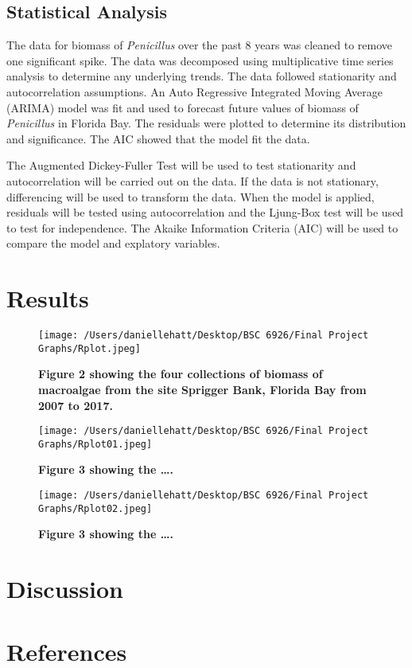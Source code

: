 \documentclass[]{article}
\begin{document}
\hypertarget{statistical-analysis}{%
\subsection{Statistical Analysis}\label{statistical-analysis}}

The data for biomass of \emph{Penicillus} over the past 8 years was
cleaned to remove one significant spike. The data was decomposed using
multiplicative time series analysis to determine any underlying trends.
The data followed stationarity and autocorrelation assumptions. An Auto
Regressive Integrated Moving Average (ARIMA) model was fit and used to
forecast future values of biomass of \emph{Penicillus} in Florida Bay.
The residuals were plotted to determine its distribution and
significance. The AIC showed that the model fit the data.

The Augmented Dickey-Fuller Test will be used to test stationarity and
autocorrelation will be carried out on the data. If the data is not
stationary, differencing will be used to transform the data. When the
model is applied, residuals will be tested using autocorrelation and the
Ljung-Box test will be used to test for independence. The Akaike
Information Criteria (AIC) will be used to compare the model and
explatory variables.

\hypertarget{results}{%
\section{Results}\label{results}}

\begin{figure}
\centering
\texttt{[image: /Users/daniellehatt/Desktop/BSC 6926/Final Project Graphs/Rplot.jpeg]}
\caption{\textbf{Figure 2 showing the four collections of biomass of
macroalgae from the site Sprigger Bank, Florida Bay from 2007 to 2017.}}
\end{figure}

\begin{figure}
\centering
\texttt{[image: /Users/daniellehatt/Desktop/BSC 6926/Final Project Graphs/Rplot01.jpeg]}
\caption{\textbf{Figure 3 showing the \ldots{}.}}
\end{figure}

\begin{figure}
\centering
\texttt{[image: /Users/daniellehatt/Desktop/BSC 6926/Final Project Graphs/Rplot02.jpeg]}
\caption{\textbf{Figure 3 showing the \ldots{}.}}
\end{figure}

\hypertarget{discussion}{%
\section{Discussion}\label{discussion}}

\hypertarget{references}{%
\section{References}\label{references}}
\end{document}
